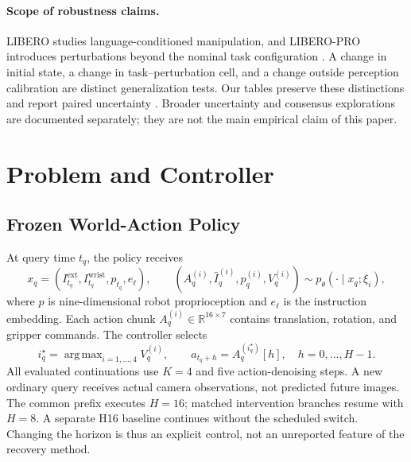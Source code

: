 \documentclass{article}
\newcommand{\R}{\mathbb{R}}
\DeclareMathOperator*{\argmax}{arg\,max}
\begin{document}
\paragraph{Scope of robustness claims.}
LIBERO studies language-conditioned manipulation, and LIBERO-PRO introduces
perturbations beyond the nominal task configuration \citep{libero,libero_pro}.
A change in initial state, a change in task--perturbation cell, and a change
outside perception calibration are distinct generalization tests.
Our tables preserve these distinctions and report paired uncertainty
\citep{rliable}. Broader uncertainty and consensus explorations are documented
separately; they are not the main empirical claim of this paper.

\section{Problem and Controller}
\label{sec:method}
\subsection{Frozen World-Action Policy}
At query time $t_q$, the policy receives
\begin{equation}
x_q=(I^{\mathrm{ext}}_{t_q},I^{\mathrm{wrist}}_{t_q},p_{t_q},e_\ell),
\qquad
(A_q^{(i)},\widehat I_q^{(i)},\widehat p_q^{(i)},V_q^{(i)})
\sim p_\theta(\cdot\mid x_q;\xi_i),
\label{eq:policy}
\end{equation}
where $p$ is nine-dimensional robot proprioception and $e_\ell$ is the
instruction embedding. Each action chunk $A_q^{(i)}\in\R^{16\times7}$
contains translation, rotation, and gripper commands. The controller selects
\begin{equation}
i_q^\star=\argmax_{i=1,\ldots,4} V_q^{(i)},\qquad
a_{t_q+h}=A_q^{(i_q^\star)}[h],\quad h=0,\ldots,H-1.
\label{eq:selection}
\end{equation}
All evaluated continuations use $K=4$ and five action-denoising steps.
A new ordinary query receives actual camera observations, not predicted
future images. The common prefix executes $H=16$; matched intervention
branches resume with $H=8$.
A separate H16 baseline continues without the scheduled switch.
Changing the horizon is thus an explicit control, not an unreported feature
of the recovery method.
\end{document}

